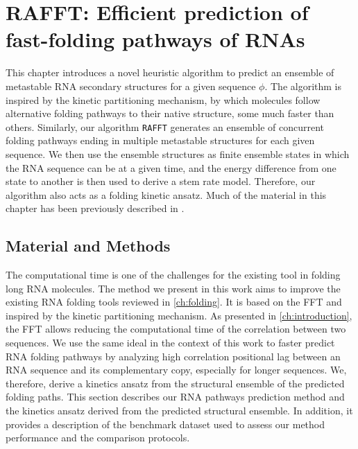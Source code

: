 \chapter{RAFFT: Efficient prediction of fast-folding pathways of RNAs}\label{ch:rafft}
This chapter introduces a novel heuristic algorithm to predict an ensemble of metastable \ac{RNA} secondary structures for a given sequence $\phi$. The algorithm is inspired by the kinetic partitioning mechanism, by which molecules follow alternative folding pathways to their native structure, some much faster than others. Similarly, our algorithm \texttt{RAFFT} generates an ensemble of concurrent folding pathways ending in multiple metastable structures for each given sequence. We then use the ensemble structures as finite ensemble states in which the \ac{RNA} sequence can be at a given time, and the energy difference from one state to another is then used to derive a stem rate model. Therefore, our algorithm also acts as a folding kinetic ansatz. Much of the material in this chapter has been previously described in \cite{opuu2021rafft}.
\section{Material and Methods}
The computational time is one of the challenges for the existing tool in folding long \ac{RNA} molecules. The method we present in this work aims to improve the existing \ac{RNA} folding tools reviewed in \autoref{ch:folding}. It is based on the \ac{FFT} and inspired by the kinetic partitioning mechanism. As presented in \autoref{ch:introduction}, the \ac{FFT} allows reducing the computational time of the correlation between two sequences. We use the same ideal in the context of this work to faster predict \ac{RNA} folding pathways by analyzing high correlation positional lag between an \ac{RNA} sequence and its complementary copy, especially for longer sequences. We, therefore, derive a kinetics ansatz from the structural ensemble of the predicted folding paths. 
This section describes our \ac{RNA} pathways prediction method and the kinetics ansatz derived from the predicted structural ensemble. In addition, it provides a description of the benchmark dataset used to assess our method performance and the comparison protocols. 
